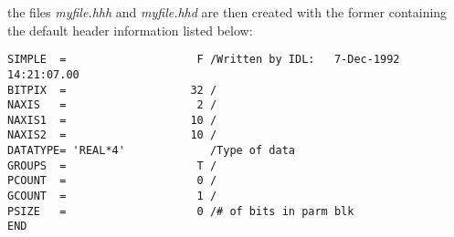 \begin{description}
\noindent
the files {\it myfile.hhh} and {\it myfile.hhd} are then created with
the former containing the default header information listed below: 

\begin{scriptsize}
\begin{center}
\begin{verbatim}
SIMPLE  =                    F /Written by IDL:   7-Dec-1992 14:21:07.00
BITPIX  =                   32 /
NAXIS   =                    2 /
NAXIS1  =                   10 /
NAXIS2  =                   10 /
DATATYPE= 'REAL*4'             /Type of data
GROUPS  =                    T /
PCOUNT  =                    0 /
GCOUNT  =                    1 /
PSIZE   =                    0 /# of bits in parm blk
END
\end{verbatim}
\end{center}
\end{scriptsize}
\end{description}

